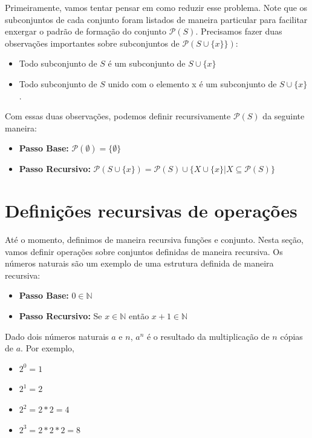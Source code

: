 Primeiramente, vamos tentar pensar em como reduzir esse problema. Note que os subconjuntos de cada conjunto foram listados de maneira particular para facilitar enxergar o padrão de formação do conjunto $\mathcal{P}(S)$. Precisamos fazer duas observações importantes sobre subconjuntos de $\mathcal{P}(S \cup \{x\}\})$:

\begin{itemize}
    \item Todo subconjunto de $S$ é um subconjunto de $S \cup \{x\}$
    \item Todo subconjunto de $S$ unido com o elemento x é um subconjunto de $S \cup \{x\}$.
\end{itemize}

Com essas duas observações, podemos definir recursivamente $\mathcal{P}(S)$ da seguinte maneira:

\begin{itemize}
    \item \textbf{Passo Base:} $\mathcal{P}(\emptyset) = \{\emptyset\}$
    \item \textbf{Passo Recursivo:} $\mathcal{P}(S \cup \{x\}) = \mathcal{P}(S) \cup \{ X \cup \{x\} | X \subseteq  \mathcal{P}(S)\}$
\end{itemize}

\section{Definições recursivas de operações}

Até o momento, definimos de maneira recursiva funções e conjunto. Nesta seção, vamos definir operações sobre conjuntos definidas de maneira recursiva. Os números naturais são um exemplo de uma estrutura definida de maneira recursiva:

\begin{itemize}
    \item \textbf{Passo Base:} $0 \in \mathbb{N}$
    \item \textbf{Passo Recursivo:} Se $x \in \mathbb{N}$ então $x+1 \in \mathbb{N}$
\end{itemize}



\begin{exemplo}
Dado dois números naturais $a$ e $n$, $a^n$ é o resultado da multiplicação de $n$ cópias de $a$. Por exemplo,

\begin{itemize}
    \item $2^0 = 1$
    \item $2^1 = 2$
    \item $2^2 = 2*2 = 4$
    \item $2^3 = 2*2*2 = 8$
\end{itemize}
\end{exemplo}


